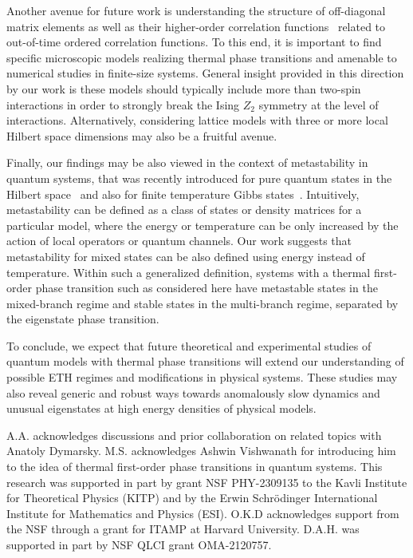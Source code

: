 \documentclass[aps,prx,showpacs,amsmath,amssymb,superscriptaddress,twocolumn,longbibliography,10pt,nofootinbib]{revtex4-2}
\begin{document}
Another avenue for future work is understanding the structure of off-diagonal matrix elements as well as their higher-order correlation functions~\cite{Kurchan22} related to out-of-time ordered correlation functions. To this end, it is important to find specific microscopic models realizing thermal phase transitions and amenable to numerical studies in finite-size systems. General insight provided in this direction by our work is these models should typically include more than two-spin interactions in order to strongly break the Ising $Z_2$ symmetry at the level of interactions. Alternatively, considering lattice models with three or more local Hilbert space dimensions may also be a fruitful avenue.

Finally, our findings may be also viewed in the context of metastability in quantum systems, that was recently introduced for pure quantum states in the Hilbert space~\cite{Lucas24} and also for finite temperature Gibbs states~\cite{Zhou24}. Intuitively, metastability can be defined as a class of states or density matrices for a particular model, where the energy or temperature can be only increased by the action of local operators or quantum channels. Our work suggests that metastability for mixed states can be also defined using energy instead of temperature. Within such a generalized definition, systems with a thermal first-order phase transition such as considered here have metastable states in the mixed-branch regime and stable states in the multi-branch regime, separated by the eigenstate phase transition.

To conclude, we expect that future theoretical and experimental studies of quantum models with thermal phase transitions will extend our understanding of possible ETH regimes and modifications in physical systems. These studies may also reveal generic and robust ways towards anomalously slow dynamics and unusual eigenstates at high energy densities of physical models. 

\begin{acknowledgments}
A.A. acknowledges discussions and prior collaboration on related topics with Anatoly Dymarsky. 
M.S. acknowledges Ashwin Vishwanath for introducing him to the idea of thermal first-order phase transitions in quantum systems. 
This research was supported in part by grant NSF PHY-2309135 to the Kavli Institute for Theoretical Physics (KITP) 
and by the Erwin Schrödinger International Institute for Mathematics and Physics (ESI). O.K.D acknowledges support from the NSF through a grant for ITAMP at Harvard University. 
D.A.H. was supported in part by NSF QLCI grant OMA-2120757.

\end{acknowledgments}
\end{document}
